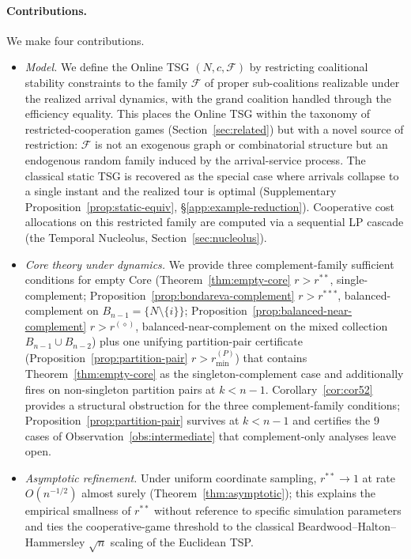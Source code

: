 \documentclass[11pt]{article}
\theoremstyle{plain}
\theoremstyle{definition}
\theoremstyle{remark}
\newcommand{\F}{\mathcal{F}}
\begin{document}
\paragraph{Contributions.} We make four contributions.
\begin{itemize}[leftmargin=1.5em]
\item[\textbf{C1.}] \emph{Model.} We define the Online TSG $(N, c, \F)$ by restricting coalitional stability constraints to the family $\F$ of proper sub-coalitions realizable under the realized arrival dynamics, with the grand coalition handled through the efficiency equality. This places the Online TSG within the taxonomy of restricted-cooperation games (Section~\ref{sec:related}) but with a novel source of restriction: $\F$ is not an exogenous graph or combinatorial structure but an endogenous random family induced by the arrival-service process. The classical static TSG is recovered as the special case where arrivals collapse to a single instant and the realized tour is optimal (Supplementary Proposition~\ref{prop:static-equiv}, \S\ref{app:example-reduction}). Cooperative cost allocations on this restricted family are computed via a sequential LP cascade (the Temporal Nucleolus, Section~\ref{sec:nucleolus}).
\item[\textbf{C2.}] \emph{Core theory under dynamics.} We provide three complement-family sufficient conditions for empty Core (Theorem~\ref{thm:empty-core} $r>r^{\ast\ast}$, single-complement; Proposition~\ref{prop:bondareva-complement} $r>r^{\ast\ast\ast}$, balanced-complement on $B_{n-1}=\{N\setminus\{i\}\}$; Proposition~\ref{prop:balanced-near-complement} $r>r^{(\diamond)}$, balanced-near-complement on the mixed collection $B_{n-1}\cup B_{n-2}$) plus one unifying partition-pair certificate (Proposition~\ref{prop:partition-pair} $r>r^{(P)}_{\min}$) that contains Theorem~\ref{thm:empty-core} as the singleton-complement case and additionally fires on non-singleton partition pairs at $k<n-1$. Corollary~\ref{cor:cor52} provides a structural obstruction for the three complement-family conditions; Proposition~\ref{prop:partition-pair} survives at $k<n-1$ and certifies the 9 cases of Observation~\ref{obs:intermediate} that complement-only analyses leave open.
\item[\textbf{C3.}] \emph{Asymptotic refinement.} Under uniform coordinate sampling, $r^{\ast\ast}\to 1$ at rate $O(n^{-1/2})$ almost surely (Theorem~\ref{thm:asymptotic}); this explains the empirical smallness of $r^{\ast\ast}$ without reference to specific simulation parameters and ties the cooperative-game threshold to the classical Beardwood--Halton--Hammersley $\sqrt{n}$ scaling of the Euclidean TSP.

\end{itemize}
\end{document}
